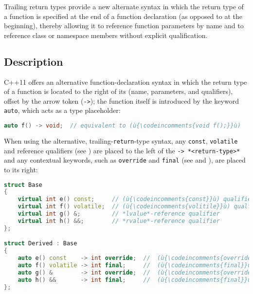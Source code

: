 

Trailing return types provide a new alternate syntax in which the return type of a function is specified at
the end of a function declaration (as opposed to at the beginning),
thereby allowing it to reference function parameters by name and to reference class
or namespace members without explicit qualification.

\subsection[Description]{Description}\label{description}

C++11 offers an alternative function-declaration syntax in which the
return type of a function is located to the right of its
 (name, parameters, and qualifiers), offset by the
arrow token (\lstinline!->!); the function itself is introduced by the
keyword \lstinline!auto!, which acts as a type placeholder:
%

\begin{lstlisting}[language=C++]
auto f() -> void;  // equivalent to (ù{\codeincomments{void f();}}ù)
\end{lstlisting}
    
When using the alternative, trailing-\lstinline!return!-type syntax, any \lstinline!const!,
\lstinline!volatile! and reference qualifiers (see 
) are placed to the left of 
the \lstinline!->!~\lstinline!*<return-type>*! and any contextual keywords, such as
\lstinline!override! and \lstinline!final! (see 
and 
), are placed to its right:

\begin{lstlisting}[language=C++]
struct Base
{
    virtual int e() const;     // (ù{\codeincomments{const}}ù) qualifier
    virtual int f() volatile;  // (ù{\codeincomments{volitile}}ù) qualfier
    virtual int g() &;         // *lvalue*-reference qualifier
    virtual int h() &&;        // *rvalue*-reference qualifier
};

struct Derived : Base
{
    auto e() const    -> int override;  //  (ù{\codeincomments{override}}ù) contextual keyword
    auto f() volatile -> int final;     //  (ù{\codeincomments{final}}ù)         "        "
    auto g() &        -> int override;  //  (ù{\codeincomments{override}}ù)      "        "
    auto h() &&       -> int final;     //  (ù{\codeincomments{final}}ù)         "        "
};
\end{lstlisting}

